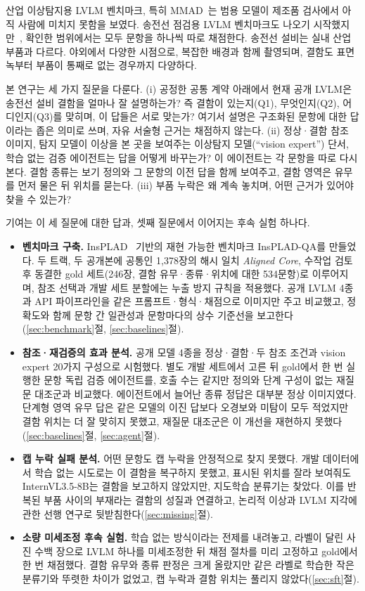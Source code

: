 \documentclass[11pt]{article}
\begin{document}
산업 이상탐지용 LVLM 벤치마크, 특히 MMAD~\cite{jiang2025mmad}는 범용 모델이 제조품 검사에서 아직 사람에 미치지 못함을 보였다. 송전선 점검용 LVLM 벤치마크도 나오기 시작했지만~\cite{wang2024powerllava,zhong2026powergpt,zhang2026elecvqa}, 확인한 범위에서는 모두 문항을 하나씩 따로 채점한다. 송전선 설비는 실내 산업 부품과 다르다. 야외에서 다양한 시점으로, 복잡한 배경과 함께 촬영되며, 결함도 표면 녹부터 부품이 통째로 없는 경우까지 다양하다.

본 연구는 세 가지 질문을 다룬다. (i) 공정한 공통 계약 아래에서 현재 공개 LVLM은 송전선 설비 결함을 얼마나 잘 설명하는가? 즉 결함이 있는지(Q1), 무엇인지(Q2), 어디인지(Q3)를 맞히며, 이 답들은 서로 맞는가? 여기서 설명은 구조화된 문항에 대한 답이라는 좁은 의미로 쓰며, 자유 서술형 근거는 채점하지 않는다. (ii) 정상·결함 참조 이미지, 탐지 모델이 이상을 본 곳을 보여주는 이상탐지 모델(``vision expert'') 단서, 학습 없는 검증 에이전트는 답을 어떻게 바꾸는가? 이 에이전트는 각 문항을 따로 다시 본다. 결함 종류는 보기 정의와 그 문항의 이전 답을 함께 보여주고, 결함 영역은 유무를 먼저 물은 뒤 위치를 묻는다. (iii) 부품 누락은 왜 계속 놓치며, 어떤 근거가 있어야 찾을 수 있는가?

기여는 이 세 질문에 대한 답과, 셋째 질문에서 이어지는 후속 실험 하나다.
\begin{itemize}
  \item \textbf{벤치마크 구축.} InsPLAD~\cite{vieira2023insplad} 기반의 재현 가능한 벤치마크 InsPLAD-QA를 만들었다. 두 트랙, 두 공개본에 공통인 1,378장의 해시 일치 \emph{Aligned Core}, 수작업 검토 후 동결한 gold 세트(246장, 결함 유무·종류·위치에 대한 534문항)로 이루어지며, 참조 선택과 개발 세트 분할에는 누출 방지 규칙을 적용했다. 공개 LVLM 4종과 API 파이프라인을 같은 프롬프트·형식·채점으로 이미지만 주고 비교했고, 정확도와 함께 문항 간 일관성과 문항마다의 상수 기준선을 보고한다(\ref{sec:benchmark}절, \ref{sec:baselines}절).
  \item \textbf{참조·재검증의 효과 분석.} 공개 모델 4종을 정상·결함·두 참조 조건과 vision expert 20가지 구성으로 시험했다. 별도 개발 세트에서 고른 뒤 gold에서 한 번 실행한 문항 독립 검증 에이전트를, 호출 수는 같지만 정의와 단계 구성이 없는 재질문 대조군과 비교했다. 에이전트에서 늘어난 종류 정답은 대부분 정상 이미지였다. 단계형 영역 유무 답은 같은 모델의 이진 답보다 오경보와 미탐이 모두 적었지만 결함 위치는 더 잘 맞히지 못했고, 재질문 대조군은 이 개선을 재현하지 못했다(\ref{sec:baselines}절, \ref{sec:agent}절).
  \item \textbf{캡 누락 실패 분석.} 어떤 문항도 캡 누락을 안정적으로 찾지 못했다. 개발 데이터에서 학습 없는 시도로는 이 결함을 복구하지 못했고, 표시된 위치를 잘라 보여줘도 InternVL3.5-8B는 결함을 보고하지 않았지만, 지도학습 분류기는 찾았다. 이를 반복된 부품 사이의 부재라는 결함의 성질과 연결하고, 논리적 이상과 LVLM 지각에 관한 선행 연구로 뒷받침한다(\ref{sec:missing}절).
  \item \textbf{소량 미세조정 후속 실험.} 학습 없는 방식이라는 전제를 내려놓고, 라벨이 달린 사진 수백 장으로 LVLM 하나를 미세조정한 뒤 채점 절차를 미리 고정하고 gold에서 한 번 채점했다. 결함 유무와 종류 판정은 크게 올랐지만 같은 라벨로 학습한 작은 분류기와 뚜렷한 차이가 없었고, 캡 누락과 결함 위치는 풀리지 않았다(\ref{sec:sft}절).
\end{itemize}
\end{document}
